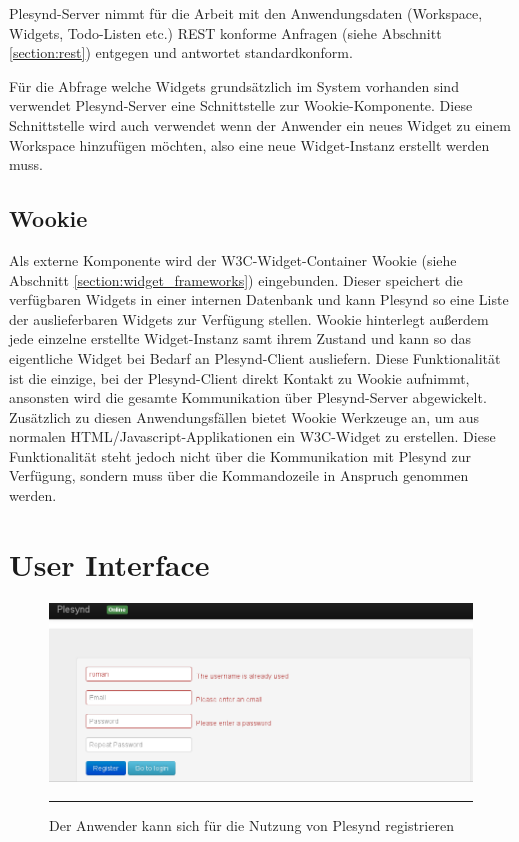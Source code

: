 Plesynd-Server nimmt für die Arbeit mit den Anwendungsdaten (Workspace, Widgets, Todo-Listen etc.) REST konforme Anfragen (siehe Abschnitt \ref{section:rest}) entgegen und antwortet standardkonform.

Für die Abfrage welche Widgets grundsätzlich im System vorhanden sind verwendet Plesynd-Server eine Schnittstelle zur Wookie-Komponente. Diese Schnittstelle wird auch verwendet wenn der Anwender ein neues Widget zu einem Workspace hinzufügen möchten, also eine neue Widget-Instanz erstellt werden muss.

\subsection{Wookie}\label{section:loesung_wookie}
Als externe Komponente wird der W3C-Widget-Container Wookie (siehe Abschnitt \ref{section:widget_frameworks}) eingebunden. Dieser speichert die verfügbaren Widgets in einer internen Datenbank und kann Plesynd so eine Liste der auslieferbaren Widgets zur Verfügung stellen. Wookie hinterlegt außerdem jede einzelne erstellte Widget-Instanz samt ihrem Zustand und kann so das eigentliche Widget bei Bedarf an Plesynd-Client ausliefern. Diese Funktionalität ist die einzige, bei der Plesynd-Client direkt Kontakt zu Wookie aufnimmt, ansonsten wird die gesamte Kommunikation über Plesynd-Server abgewickelt. Zusätzlich zu diesen Anwendungsfällen bietet Wookie Werkzeuge an, um aus normalen HTML/Javascript-Applikationen ein W3C-Widget zu erstellen. Diese Funktionalität steht jedoch nicht über die Kommunikation mit Plesynd zur Verfügung, sondern muss über die Kommandozeile in Anspruch genommen werden.

\section{User Interface}\label{section:user_interface}
\begin{figure}
  \centering
  \includegraphics[width=\textwidth,height=\textheight,keepaspectratio]{./Figures/plesynd_register.png}
    \rule{35em}{0.5pt}
  \caption[Plesynd User-Interface: Registrieren]{Der Anwender kann sich für die Nutzung von Plesynd registrieren}
  \label{fig:plesynd_register}
\end{figure}

